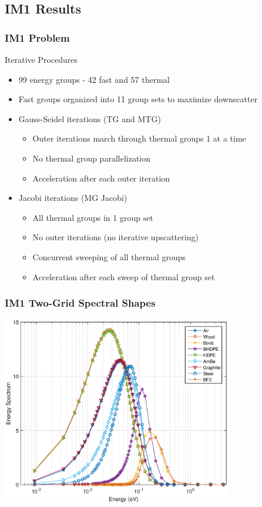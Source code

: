 \documentclass[compress,10pt]{beamer}
\begin{document}
\subsection{IM1 Results}
\begin{frame}[t]\frametitle{IM1 Problem}
\begin{block}{Iterative Procedures}
\begin{itemize}
	\item 99 energy groups - 42 fast and 57 thermal
	\item Fast groups organized into 11 group sets to maximize downscatter
	\item Gauss-Seidel iterations (TG and MTG)
	\begin{itemize}
		\item Outer iterations march through thermal groups 1 at a time
		\item No thermal group parallelization
		\item Acceleration after each outer iteration
	\end{itemize}
	\item Jacobi iterations (MG Jacobi)
	\begin{itemize}
		\item All thermal groups in 1 group set
		\item No outer iterations (no iterative upscattering)
		\item Concurrent sweeping of all thermal groups
		\item Acceleration after each sweep of thermal group set
	\end{itemize}
\end{itemize}
\end{block}
\end{frame}
\begin{frame}[t]
\frametitle{IM1 Two-Grid Spectral Shapes}
\hspace*{1.1cm}
\includegraphics[width=0.75\textwidth]{images/IM1_EC_TG.eps}
\end{frame}
\end{document}
